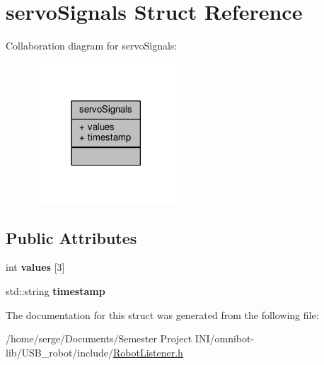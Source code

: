 \hypertarget{structservo_signals}{}\section{servo\+Signals Struct Reference}
\label{structservo_signals}


Collaboration diagram for servo\+Signals\+:
\nopagebreak
\begin{figure}[H]
\begin{center}
\leavevmode
\includegraphics[width=153pt]{structservo_signals__coll__graph}
\end{center}
\end{figure}
\subsection*{Public Attributes}
\begin{DoxyCompactItemize}
\item 
\hypertarget{structservo_signals_a0ed5b965b518f964a9a63f432d142a5b}{}int {\bfseries values} \mbox{[}3\mbox{]}\label{structservo_signals_a0ed5b965b518f964a9a63f432d142a5b}

\item 
\hypertarget{structservo_signals_ad8060d17bc7e15051080dfb5f504b061}{}std\+::string {\bfseries timestamp}\label{structservo_signals_ad8060d17bc7e15051080dfb5f504b061}

\end{DoxyCompactItemize}


The documentation for this struct was generated from the following file\+:\begin{DoxyCompactItemize}
\item 
/home/serge/\+Documents/\+Semester Project I\+N\+I/omnibot-\/lib/\+U\+S\+B\+\_\+robot/include/\hyperlink{_robot_listener_8h}{Robot\+Listener.\+h}\end{DoxyCompactItemize}
